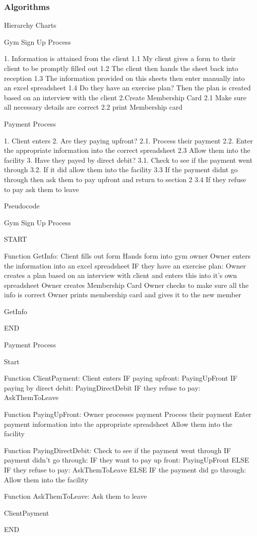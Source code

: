 \subsubsection{Algorithms}

Hierarchy Charts

Gym Sign Up Process
\begin{python}
1. Information is attained from the client
	1.1 My client gives a form to their client to be promptly filled out
	1.2 The client then hands the sheet back into reception 
	1.3 The information provided on this sheets then enter manually into an excel spreadsheet
	1.4 Do they have an exercise plan? Then the plan is created based on an interview with the client
2.Create Membership Card
	2.1 Make sure all necessary details are correct
	2.2 print Membership card 
\end{python}

Payment Process
\begin{python}
1. Client enters
2. Are they paying upfront?
2.1. Process their payment
2.2. Enter the appropriate information into the correct spreadsheet
2.3 Allow them into the facility
3. Have they payed by direct debit?
3.1. Check to see if the payment went through
3.2. If it did allow them into the facility
3.3 If the payment didnt go through then ask them to pay upfront and return to section 2
3.4 If they refuse to pay ask them to leave
\end{python}

Pseudocode

\begin{python}
Gym Sign Up Process

START

Function GetInfo:
	Client fills out form
	Hands form into gym owner
	Owner enters the information into an excel spreadsheet
	IF they have an exercise plan:
		Owner creates a plan based on an interview with client and enters this into it’s
own spreadsheet
	Owner creates Membership Card
	Owner checks to make sure all the info is correct
	Owner prints membership card and gives it to the new member

GetInfo

END


Payment Process

Start

Function ClientPayment:
	Client enters
	IF paying upfront:
		PayingUpFront
	IF paying by direct debit:
		PayingDirectDebit
	IF they refuse to pay:
		AskThemToLeave

Function PayingUpFront:
	Owner processes payment
	Process their payment
	Enter payment information into the appropriate spreadsheet
	Allow them into the facility

Function PayingDirectDebit:
	Check to see if the payment went through
	IF payment didn’t go through:
		IF they want to pay up front:
			PayingUpFront
		ELSE IF they refuse to pay:
			AskThemToLeave
	ELSE IF the payment did go through:
		Allow them into the facility

Function AskThemToLeave:
	Ask them to leave

ClientPayment 

END
\end{python}


